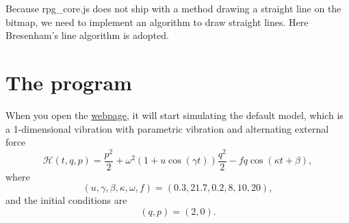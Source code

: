 \documentclass[12pt]{article}
\begin{document}
Because rpg\_core.js does not ship with a method drawing a straight line on the bitmap,
we need to implement an algorithm to draw straight lines.
Here Bresenham's line algorithm \cite{gaol2013bresenham} is adopted.

\section{The program}
\label{sec:program}

When you open the \href{https://UlyssesZh.github.io/rpg/mechsimul2}{webpage},
it will start simulating the default model,
which is a 1-dimensional vibration with parametric vibration \cite[p. 82]{landau1976mechanics} and alternating external force \cite[p. 61]{landau1976mechanics}
\begin{equation}
  \mathcal H\left(t,q,p\right)=\frac{p^2}2+\omega^2\left(1+u\cos\left(\gamma t\right)\right)\frac{q^2}2-fq\cos\left(\kappa t+\beta\right),
\end{equation}
where
\begin{equation*}
  \left(u,\gamma,\beta,\kappa,\omega,f\right)=\left(0.3,21.7,0.2,8,10,20\right),
\end{equation*}
and the initial conditions are
\begin{equation*}
  \left(q,p\right)=\left(2,0\right).
\end{equation*}
\end{document}
